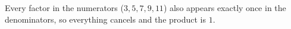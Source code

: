 Every factor in the numerators ($3,5,7,9,11$) also appears exactly once in the denominators, so everything cancels and the product is $\boxed{1}$.
